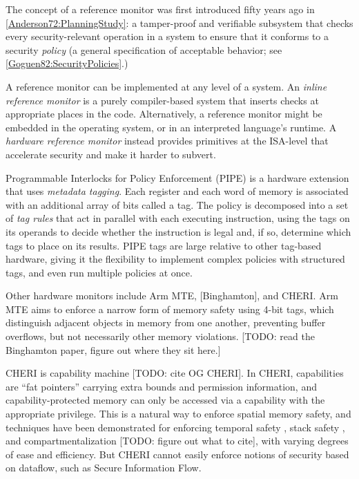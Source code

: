\documentclass[acmsmall,review,anonymous]{acmart}\settopmatter{printfolios=true,printccs=false,printacmref=false}
\begin{document}
The concept of a reference monitor was first introduced fifty years ago in \cref{Anderson72:PlanningStudy}:
a tamper-proof and verifiable subsystem that checks every security-relevant operation in a system to
ensure that it conforms to a security {\em policy} (a general specification of acceptable behavior;
see \cref{Goguen82:SecurityPolicies}.)

A reference monitor can be implemented at any level of a system. An {\em inline reference monitor}
is a purely compiler-based system that inserts checks at appropriate places in the code.
Alternatively, a reference monitor might be embedded in the operating system, or in an interpreted
language's runtime. A {\em hardware reference monitor} instead provides primitives at the ISA-level
that accelerate security and make it harder to subvert.

Programmable Interlocks for Policy Enforcement (PIPE) \cite{Dhawan14:PUMP} is a hardware extension
that uses {\em metadata tagging}. Each register and each word of memory is associated with
an additional array of bits called a tag. The policy is decomposed into a set of {\em tag rules}
that act in parallel with each executing instruction, using the tags on its operands to
decide whether the instruction is legal and, if so, determine which tags to place on its results.
PIPE tags are large relative to other tag-based hardware, giving it the flexibility
to implement complex policies with structured tags, and even run multiple policies at once.

Other hardware monitors include Arm MTE, [Binghamton], and CHERI.
Arm MTE aims to enforce a narrow form of memory safety using 4-bit tags, which distinguish adjacent objects
in memory from one another, preventing buffer overflows, but not necessarily other memory violations.
[TODO: read the Binghamton paper, figure out where they sit here.] 

CHERI is capability machine [TODO: cite OG CHERI]. In CHERI, capabilities
are ``fat pointers'' carrying extra bounds and permission information, and capability-protected
memory can only be accessed via a capability with the appropriate privilege. This is a natural
way to enforce spatial memory safety, and techniques have been demonstrated for enforcing
temporal safety \cite{NWF20:Cornucopia}, stack safety \cite{Skorstengaard19:stktokens},
and compartmentalization [TODO: figure out what to cite], with varying degrees of ease and
efficiency. But CHERI cannot easily enforce notions of security based on dataflow,
such as Secure Information Flow.
\end{document}
